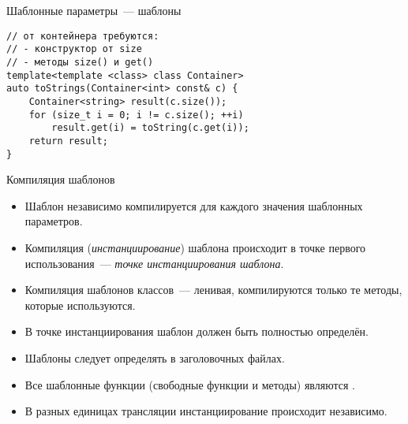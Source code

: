 \documentclass{beamer}
\begin{document}
\begin{frame}[fragile]{Шаблонные параметры~--- шаблоны}
\small
    \begin{lstlisting}
// от контейнера требуются:
// - конструктор от size
// - методы size() и get()
template<template <class> class Container>
auto toStrings(Container<int> const& c) {
    Container<string> result(c.size());
    for (size_t i = 0; i != c.size(); ++i)
        result.get(i) = toString(c.get(i));
    return result;
}
    \end{lstlisting}
\end{frame}

\begin{frame}[fragile]{Компиляция шаблонов}
\small
    \begin{itemize}
        \item Шаблон независимо компилируется для каждого значения шаблонных
            параметров.

        \item Компиляция ({\em инстанциирование}) шаблона происходит в точке первого использования~---
            {\em точке инстанциирования шаблона}.

        \item Компиляция шаблонов классов~— ленивая, компилируются только те методы,
            которые используются.
        
        \item В точке инстанциирования шаблон должен быть полностью определён.

        \item Шаблоны следует определять в заголовочных файлах.

        \item Все шаблонные функции (свободные функции и методы) являются
            .

        \item В разных единицах трансляции инстанциирование происходит
            независимо.
    \end{itemize}
\end{frame}
\end{document}
